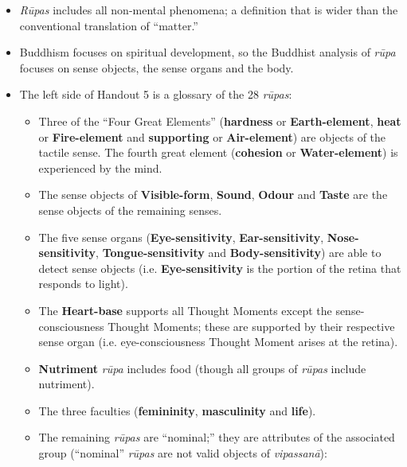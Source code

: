 \begin{itemize}

\item \textit{Rūpas} includes all non-mental phenomena; a definition that is wider than the conventional translation of “matter.”

\item Buddhism focuses on spiritual development, so the Buddhist analysis of \textit{rūpa} focuses on sense objects, the sense organs and the body. 

\item The left side of Handout 5 is a glossary of the 28 \textit{rūpas}:

\begin{itemize}

\item Three of the “Four Great Elements” (\textbf{hardness} or \textbf{Earth-element}, \textbf{heat} or \textbf{Fire-element} and \textbf{supporting} or \textbf{Air-element}) are objects of the tactile sense. The fourth great element (\textbf{cohesion} or \textbf{Water-element}) is experienced by the mind.

\item The sense objects of \textbf{Visible-form}, \textbf{Sound}, \textbf{Odour} and \textbf{Taste} are the sense objects of the remaining senses.

\item The five sense organs (\textbf{Eye-sensitivity}, \textbf{Ear-sensitivity}, \textbf{Nose-sensitivity}, \textbf{Tongue-sensitivity} and \textbf{Body-sensitivity}) are able to detect sense objects (i.e. \textbf{Eye-sensitivity} is the portion of the retina that responds to light).

\item The \textbf{Heart-base} supports all Thought Moments except the sense-consciousness Thought Moments; these are supported by their respective sense organ (i.e. eye-consciousness Thought Moment arises at the retina).

\item \textbf{Nutriment} \textit{rūpa} includes food (though all groups of \textit{rūpas} include nutriment).

\item The three faculties (\textbf{femininity}, \textbf{masculinity} and \textbf{life}).

\item The remaining \textit{rūpas} are “nominal;” they are attributes of the associated group (“nominal” \textit{rūpas} are not valid objects of \textit{vipassanā}):


\end{itemize}
\end{itemize}
